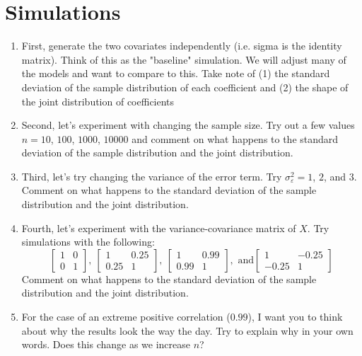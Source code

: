 \documentclass[12pt]{article}
\begin{document}
\section*{Simulations}
\begin{enumerate}
  \item First, generate the two covariates independently (i.e. sigma is the identity matrix). Think of this as the "baseline" simulation. We will adjust many of the models and want to compare to this. Take note of (1) the standard deviation of the sample distribution of each coefficient and (2) the shape of the joint distribution of coefficients

  \item Second, let's experiment with changing the sample size. Try out a few values $n = 10$, $100$, $1000$, $10000$ and comment on what happens to the standard deviation of the sample distribution and the joint distribution.

  \item Third, let's try changing the variance of the error term. Try $\sigma_{\varepsilon}^2 = 1$, $2$, and $3$.
  Comment on what happens to the standard deviation of the sample distribution and the joint distribution.

  \item Fourth, let's experiment with the variance-covariance matrix of $X$. Try simulations with the following:
  $$
    \begin{bmatrix}1 & 0 \\ 0 & 1\end{bmatrix},
    \
    \begin{bmatrix}1 & 0.25 \\ 0.25 & 1\end{bmatrix},
    \
    \begin{bmatrix}1 & 0.99 \\ 0.99 & 1\end{bmatrix},
    \text{ and} \begin{bmatrix}1 & -0.25 \\ -0.25 & 1\end{bmatrix}
  $$
  Comment on what happens to the standard deviation of the sample distribution and the joint distribution.

  \item For the case of an extreme positive correlation ($0.99$), I want you to think about why the results look the way the day. Try to explain why in your own words. Does this change as we increase $n$?




\end{enumerate}
\end{document}
